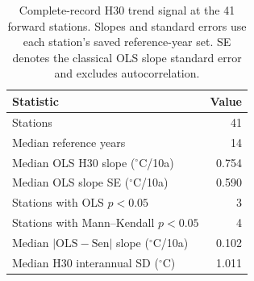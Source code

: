 \begin{table}[t]
\centering
\small
\caption{Complete-record H30 trend signal at the 41 forward stations. Slopes and standard errors use each station's saved reference-year set. SE denotes the classical OLS slope standard error and excludes autocorrelation.}
\label{tab:trend_signal_stations}
\begin{tabular}{lr}
\hline
Statistic & Value \\
\hline
Stations & 41 \\
Median reference years & 14 \\
Median OLS H30 slope ($^{\circ}$C/10a) & 0.754 \\
Median OLS slope SE ($^{\circ}$C/10a) & 0.590 \\
Stations with OLS $p<0.05$ & 3 \\
Stations with Mann--Kendall $p<0.05$ & 4 \\
Median $|\mathrm{OLS}-\mathrm{Sen}|$ slope ($^{\circ}$C/10a) & 0.102 \\
Median H30 interannual SD ($^{\circ}$C) & 1.011 \\
\hline
\end{tabular}
\end{table}

